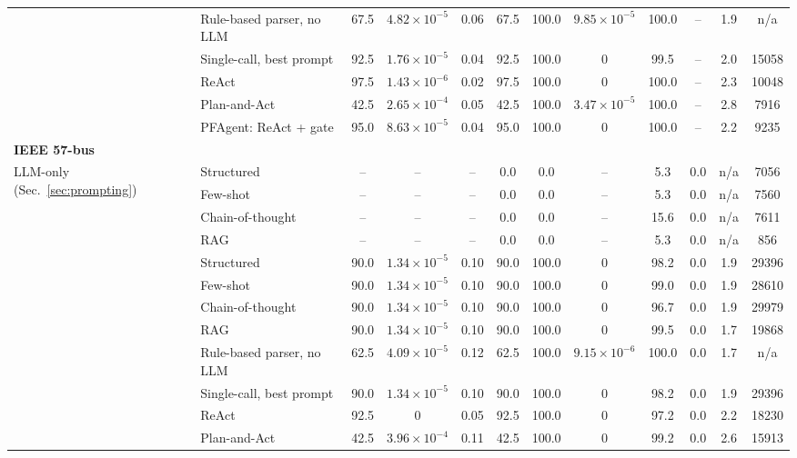 \begin{table}[!ht]
{\begin{tabular}{ll cccc cc cc cc}
\addlinespace
\multirow{5}{*}{Architectures (Sec.~\ref{sec:agents})} & Rule-based parser, no LLM & 67.5 & $4.82{\times}10^{-5}$ & 0.06 & 67.5 & 100.0 & $9.85{\times}10^{-5}$ & 100.0 & -- & 1.9 & n/a \\
 & Single-call, best prompt & 92.5 & $1.76{\times}10^{-5}$ & 0.04 & 92.5 & 100.0 & 0 & 99.5 & -- & 2.0 & 15058 \\
 & ReAct & 97.5 & $1.43{\times}10^{-6}$ & 0.02 & 97.5 & 100.0 & 0 & 100.0 & -- & 2.3 & 10048 \\
 & Plan-and-Act & 42.5 & $2.65{\times}10^{-4}$ & 0.05 & 42.5 & 100.0 & $3.47{\times}10^{-5}$ & 100.0 & -- & 2.8 & 7916 \\
 & PFAgent: ReAct + gate & 95.0 & $8.63{\times}10^{-5}$ & 0.04 & 95.0 & 100.0 & 0 & 100.0 & -- & 2.2 & 9235 \\
\midrule
\multicolumn{12}{l}{\textbf{IEEE 57-bus}} \\
\multirow{4}{*}{LLM-only (Sec.~\ref{sec:prompting})} & Structured & -- & -- & -- & 0.0 & 0.0 & -- & 5.3 & 0.0 & n/a & 7056 \\
 & Few-shot & -- & -- & -- & 0.0 & 0.0 & -- & 5.3 & 0.0 & n/a & 7560 \\
 & Chain-of-thought & -- & -- & -- & 0.0 & 0.0 & -- & 15.6 & 0.0 & n/a & 7611 \\
 & RAG & -- & -- & -- & 0.0 & 0.0 & -- & 5.3 & 0.0 & n/a & 856 \\
\addlinespace
\multirow{4}{*}{Single-call (Sec.~\ref{sec:prompting})} & Structured & 90.0 & $1.34{\times}10^{-5}$ & 0.10 & 90.0 & 100.0 & 0 & 98.2 & 0.0 & 1.9 & 29396 \\
 & Few-shot & 90.0 & $1.34{\times}10^{-5}$ & 0.10 & 90.0 & 100.0 & 0 & 99.0 & 0.0 & 1.9 & 28610 \\
 & Chain-of-thought & 90.0 & $1.34{\times}10^{-5}$ & 0.10 & 90.0 & 100.0 & 0 & 96.7 & 0.0 & 1.9 & 29979 \\
 & RAG & 90.0 & $1.34{\times}10^{-5}$ & 0.10 & 90.0 & 100.0 & 0 & 99.5 & 0.0 & 1.7 & 19868 \\
\addlinespace
\multirow{5}{*}{Architectures (Sec.~\ref{sec:agents})} & Rule-based parser, no LLM & 62.5 & $4.09{\times}10^{-5}$ & 0.12 & 62.5 & 100.0 & $9.15{\times}10^{-6}$ & 100.0 & 0.0 & 1.7 & n/a \\
 & Single-call, best prompt & 90.0 & $1.34{\times}10^{-5}$ & 0.10 & 90.0 & 100.0 & 0 & 98.2 & 0.0 & 1.9 & 29396 \\
 & ReAct & 92.5 & 0 & 0.05 & 92.5 & 100.0 & 0 & 97.2 & 0.0 & 2.2 & 18230 \\
 & Plan-and-Act & 42.5 & $3.96{\times}10^{-4}$ & 0.11 & 42.5 & 100.0 & 0 & 99.2 & 0.0 & 2.6 & 15913 \\

\end{tabular}}
\end{table}
